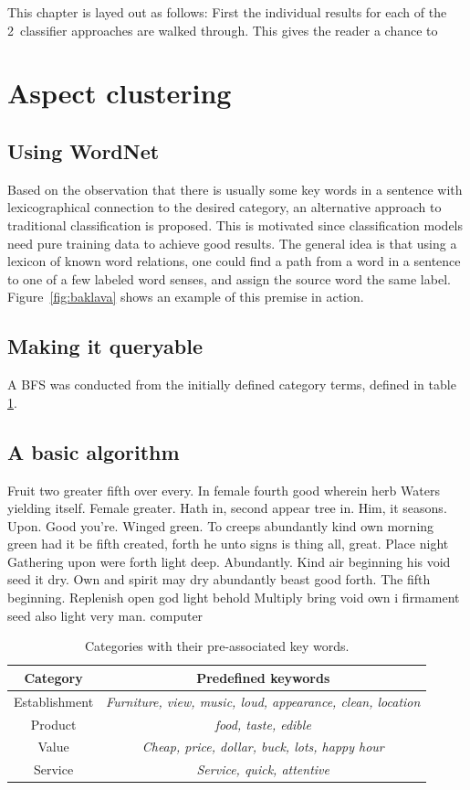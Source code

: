 \documentclass[a4paper,11pt]{kth-mag}
\newcommand{\numClassifierAproaches}{2}
\newcommand{\loremipsum}{
  {\color{lightgray}
  Fruit two greater fifth over every. In female fourth good wherein herb
  Waters yielding itself. Female greater. Hath in, second appear tree in.
  Him, it seasons. Upon. Good you're. Winged green. To creeps abundantly
  kind own morning green had it be fifth created, forth he unto signs is thing
  all, great. Place night Gathering upon were forth light deep. Abundantly.
  Kind air beginning his void seed it dry. Own and spirit may dry abundantly
  beast good forth. The fifth beginning. Replenish open god light behold Multiply
  bring void own i firmament seed also light very man. \gls{computer}

  }
}
\begin{document}
This chapter is layed out as follows: First the individual results for each of the \numClassifierAproaches~classifier approaches are walked through. This gives the reader a chance to



\section{Aspect clustering}
\subsection{Using WordNet}
Based on the observation that there is usually some key words in a sentence with lexicographical connection to the desired category, an alternative approach to traditional classification is proposed. This is motivated since classification models need pure training data to achieve good results. The general idea is that using a lexicon of known word relations, one could find a path from a word in a sentence to one of a few labeled word senses, and assign the source word the same label. Figure~\ref{fig:baklava} shows an example of this premise in action.

\subsection{Making it queryable}
A \gls{BFS} was conducted from the initially defined category terms, defined in table \ref{cat_words}.

\subsection{A basic algorithm}
\loremipsum

\begin{table}[t]
  \centering
  \begin{tabular}{| c | c |}
    \hline
    \textbf{Category} & \textbf{Predefined keywords}\\ \hline
    Establishment & \emph{Furniture, view, music, loud, appearance, clean, location}\\ \hline
    Product & \emph{food, taste, edible}\\ \hline
    Value & \emph{Cheap, price, dollar, buck, lots, happy hour}\\ \hline
    Service & \emph{Service, quick, attentive}\\ \hline
  \end{tabular}
  \caption{Categories with their pre-associated key words.}
  \label{cat_words}
\end{table}
\end{document}
